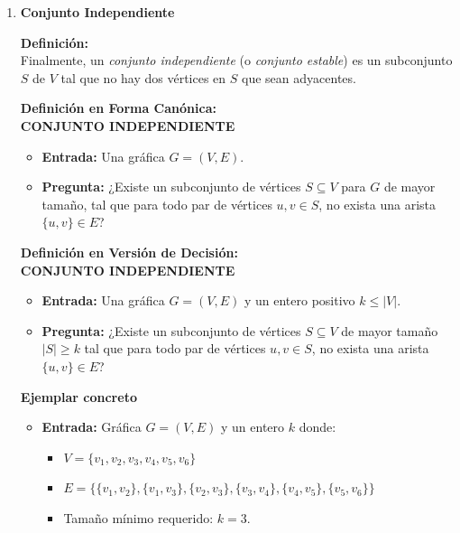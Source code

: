 \begin{enumerate}
    \textbf{Definición en Forma de Optimización:}\\
    \textbf{CUBIERTA DE VÉRTICES}
    \begin{itemize}
    \item \textbf{Datos:} Una gráfica $G = (V, E)$.
    \item \textbf{Pregunta:} ¿Cuál es el subconjunto de vértices $W \subseteq V$ de cardinalidad mínima que cubre todas las aristas de $G$? Es decir, encontrar \cite{jungnickel2005graphs}:
    \[
    \min_{W \subseteq V} |W| \quad \text{sujeto a} \quad \forall \{u, v\} \in E, \; \{u, v\} \cap W \neq \emptyset
    \]
\end{itemize}
    
    \item \textbf{Conjunto Independiente}
    
    \textbf{Definición:} \\
    Finalmente, un \emph{conjunto independiente} (o \emph{conjunto estable}) es un subconjunto $S$ de $V$ tal que no hay dos vértices en $S$ que sean adyacentes.
    
    \textbf{Definición en Forma Canónica:}\\
    \textbf{CONJUNTO INDEPENDIENTE}
    \begin{itemize}
    \item \textbf{Entrada:} Una gráfica $G = (V, E)$.
    \item \textbf{Pregunta:} ¿Existe un subconjunto de vértices $S \subseteq V$ para $G$ de mayor tamaño, tal que para todo par de vértices $u, v \in S$, no exista una arista $\{u, v\} \in E$?
\end{itemize}

    
    \textbf{Definición en Versión de Decisión:}\\
    \textbf{CONJUNTO INDEPENDIENTE}
    \begin{itemize}
    \item \textbf{Entrada:} Una gráfica $G = (V, E)$ y un entero positivo $k \le |V|$.
    \item \textbf{Pregunta:} ¿Existe un subconjunto de vértices $S \subseteq V$ de mayor tamaño $|S| \ge k$ tal que para todo par de vértices $u, v \in S$, no exista una arista $\{u, v\} \in E$?
    \end{itemize}
    \textbf{Ejemplar concreto}\\

\begin{itemize}
    \item \textbf{Entrada:} Gráfica $G = (V, E)$ y un entero $k$ donde:
        \begin{itemize}
            \item $V = \{v_1, v_2, v_3, v_4, v_5, v_6\}$
            \item $E = \{\{v_1,v_2\}, \{v_1,v_3\}, \{v_2,v_3\}, \{v_3,v_4\}, \{v_4,v_5\}, \{v_5,v_6\}\}$
            \item Tamaño mínimo requerido: $k = 3$.
        \end{itemize}


\end{itemize}
\end{enumerate}
